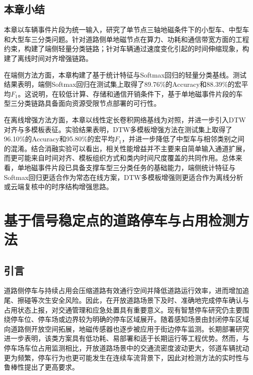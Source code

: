 \documentclass{xdupgthesis}
\begin{document}
\section{本章小结}
\label{sec:ch3_summary}

本章以车辆事件片段为统一输入，研究了单节点三轴地磁条件下的小型车、中型车和大型车三分类问题。针对道路侧单地磁节点在算力、功耗和通信带宽方面的工程约束，构建了端侧轻量分类链路；针对车辆通过速度变化引起的时间伸缩现象，构建了离线时间对齐增强链路。

在端侧方法方面，本章构建了基于统计特征与Softmax回归的轻量分类基线。测试结果表明，端侧Softmax回归在测试集上取得了89.76\%的Accuracy和88.39\%的宏平均$F_1$。这说明，在较低计算、存储和通信开销条件下，基于单地磁事件片段的车型三分类链路具备面向资源受限节点部署的可行性。

在离线增强方法方面，本章以线性定长卷积网络基线为对照，并进一步引入DTW对齐与多模板表征。实验结果表明，DTW多模板增强方法在测试集上取得了96.10\%的Accuracy和95.80\%的宏平均$F_1$，并进一步降低了中型车与相邻类别之间的混淆。结合消融实验可以看出，相关性能增益并不主要来自简单输入通道扩展，而更可能来自时间对齐、模板组织方式和类内时间尺度覆盖的共同作用。总体来看，单地磁事件片段已具备支撑车型三分类任务的基础能力，端侧统计特征与Softmax回归更适合作为常态在线方案，DTW多模板增强则更适合作为离线分析或云端复核中的时序结构增强思路。




\chapter{基于信号稳定点的道路停车与占用检测方法}
\label{ch:ch4_parking}

\section{引言}
\label{sec:ch4_intro}

道路侧停车与持续占用会压缩道路有效通行空间并降低道路运行效率，进而增加追尾、擦碰等次生安全风险。因此，在开放道路场景下及时、准确地完成停车确认与占用状态上报，对交通管理和应急处置具有重要意义。现有智慧停车研究仍主要围绕停车位、停车场或边界较为明确的停车区域展开\cite{diazogas2020spsurvey}。随着感知场景由封闭停车区域向道路侧开放空间拓展，地磁传感器也逐步被应用于街边停车监测\cite{ch4_gu2013streetparking}。长期部署研究进一步表明，该类方案具有低功耗、易部署和适于长期运行等工程优势\cite{ch4_huang2017easydeploy}。然而，与停车场车位占用监测相比，开放道路场景中的交通流密度波动更大，邻道车辆扰动更为频繁，停车行为也更可能发生在连续车流背景下，因此对检测方法的实时性与鲁棒性提出了更高要求。
\end{document}
